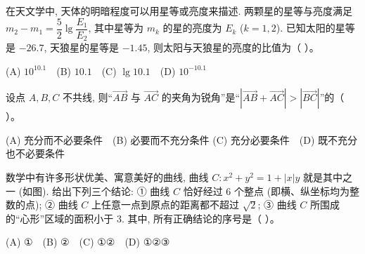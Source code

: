 \begin{question}
在天文学中, 天体的明暗程度可以用星等或亮度来描述. 两颗星的星等与亮度满足 $m_2 - m_1 = \dfrac{5}{2}\lg \dfrac{E_1}{E_2}$, 其中星等为 $m_k$ 的星的亮度为 $E_k$ ($k = 1, 2$). 已知太阳的星等是 $-26.7$, 天狼星的星等是 $-1.45$, 则太阳与天狼星的亮度的比值为（ ）。

(A) $10^{10.1}$　(B) $10.1$　(C) $\lg 10.1$　(D) $10^{-10.1}$

\end{question}
\begin{question}
设点 $A, B, C$ 不共线, 则“$\vec{AB}$ 与 $\vec{AC}$ 的夹角为锐角”是“$|\vec{AB} + \vec{AC}| > |\vec{BC}|$”的（ ）。

(A) 充分而不必要条件　(B) 必要而不充分条件  
(C) 充分必要条件　(D) 既不充分也不必要条件

\Needspace{0.4\textheight}
\end{question}
\begin{question}
数学中有许多形状优美、寓意美好的曲线, 曲线 $C: x^2 + y^2 = 1 + |x|y$ 就是其中之一 (如图). 给出下列三个结论:  
① 曲线 $C$ 恰好经过 6 个整点 (即横、纵坐标均为整数的点);  
② 曲线 $C$ 上任意一点到原点的距离都不超过 $\sqrt{2}$;  
③ 曲线 $C$ 所围成的“心形”区域的面积小于 3.  
其中, 所有正确结论的序号是（ ）。
\nopagebreak[4]
\begin{center}\end{center}
\nopagebreak[4]
(A) ①　(B) ②　(C) ①②　(D) ①②③

\par\medskip

\end{question}

